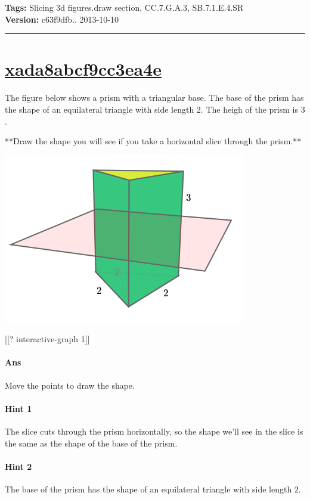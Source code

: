 \documentclass[twocolumn,10pt]{article}
\def\shrinkfactor{0.4}
\begin{document}
\medskip
\noindent
\textbf{Tags:} {\footnotesize Slicing 3d figures.draw section, CC.7.G.A.3, SB.7.1.E.4.SR}\\
\textbf{Version:} c63f9dfb.. 2013-10-10
\smallskip\hrule





\section{\href{https://www.khanacademy.org/devadmin/content/items/xada8abcf9cc3ea4e}{xada8abcf9cc3ea4e}}

\noindent
The figure below shows a prism with a triangular base. The base of the prism has the shape of an equilateral triangle with side length $2$. The heigh of the prism is $3$.   

**Draw the shape you will see if you take a horizontal slice through the prism.**


\includegraphics[scale=\shrinkfactor]{figures/21da0fa2f1b8ebc905f9314b45bdc9ef520cafa1.png}

[[? interactive-graph 1]]

\paragraph{Ans} Move the points to draw the shape. 

\paragraph{Hint 1}The slice cuts through the prism horizontally, so the shape we'll see in the slice is the same as the shape of the base of the prism.

\paragraph{Hint 2}The base of the prism has the shape of an equilateral triangle with side length $2$.
\end{document}
